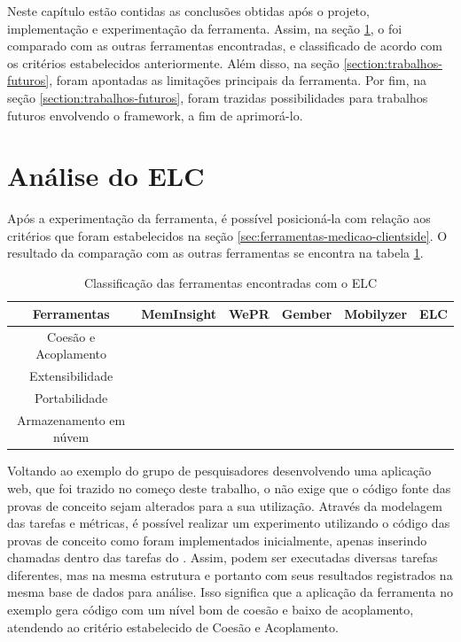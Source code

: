 \documentclass[12pt]{tcc}
\newcommand{\cmark}{\ding{51}}
\newcommand{\xmark}{\ding{55}}
\begin{document}
	Neste capítulo estão contidas as conclusões obtidas após o projeto, implementação e experimentação da ferramenta. Assim, na seção \ref{section:analise-do-elc}, o  foi comparado com as outras ferramentas encontradas, e classificado de acordo com os critérios estabelecidos anteriormente. Além disso, na seção \ref{section:trabalhos-futuros}, foram apontadas as limitações principais da ferramenta. Por fim, na seção \ref{section:trabalhos-futuros}, foram trazidas possibilidades para trabalhos futuros envolvendo o framework, a fim de aprimorá-lo.

	\section{Análise do ELC}
	\label{section:analise-do-elc}

	Após a experimentação da ferramenta, é possível posicioná-la com relação aos critérios que foram estabelecidos na seção \ref{sec:ferramentas-medicao-clientside}. O resultado da comparação com as outras ferramentas se encontra na tabela \ref{table:classificacao-com-elc}.

	\begin{table}[ht]
	\caption{Classificação das ferramentas encontradas com o ELC} %
	\centering %
	\begin{tabular}{c c c c c c} %
	\toprule %

	\textbf{Ferramentas} &\textbf{MemInsight} & \textbf{WePR} & \textbf{Gember} & \textbf{Mobilyzer} & \textbf{ELC}  \\ [0.4ex]

	\midrule %
	Coesão e Acoplamento & \cmark & \cmark & \cmark & \cmark  & \cmark  \\ 
	Extensibilidade & \xmark & \xmark & \xmark & \xmark  & \cmark \\
	Portabilidade & \cmark & \xmark & \xmark & \xmark  & \cmark \\
	Armazenamento em núvem & \xmark & \cmark & \cmark & \cmark & \cmark  \\
	\bottomrule %
	\end{tabular}
	\label{table:classificacao-com-elc} %
	\end{table}

	Voltando ao exemplo do grupo de pesquisadores desenvolvendo uma aplicação web, que foi trazido no começo deste trabalho, o  não exige que o código fonte das provas de conceito sejam alterados para a sua utilização. Através da modelagem das tarefas e métricas, é possível realizar um experimento utilizando o código das provas de conceito como foram implementados inicialmente, apenas inserindo chamadas dentro das tarefas do . Assim, podem ser executadas diversas tarefas diferentes, mas na mesma estrutura e portanto com seus resultados registrados na mesma base de dados para análise. Isso significa que a aplicação da ferramenta no exemplo gera código com um nível bom de coesão e baixo de acoplamento, atendendo ao critério estabelecido de Coesão e Acoplamento. 
\end{document}
